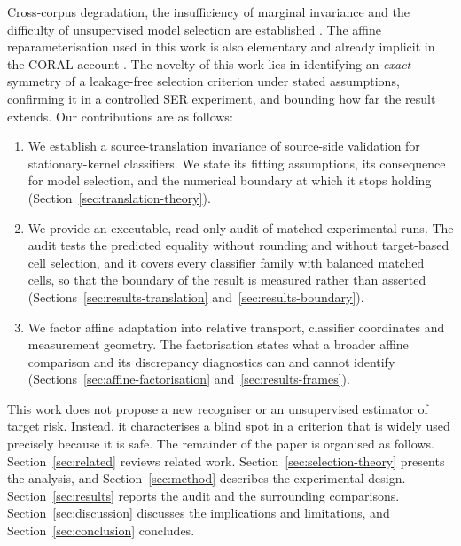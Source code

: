 Cross-corpus degradation, the insufficiency of marginal invariance and the
difficulty of unsupervised model selection are established
\cite{schuller2010cross,zhao2019invariant,you2019selection,ericsson2023practices,hu2024selection}.
The affine reparameterisation used in this work is also elementary and already
implicit in the CORAL account \cite{sun2016coral}. The novelty of this work lies
in identifying an \emph{exact} symmetry of a leakage-free selection criterion
under stated assumptions, confirming it in a controlled SER experiment, and
bounding how far the result extends. Our contributions are as follows:
\begin{enumerate}
 \item We establish a source-translation invariance of source-side validation
   for stationary-kernel classifiers. We state its fitting assumptions, its
   consequence for model selection, and the numerical boundary at which it
   stops holding (Section~\ref{sec:translation-theory}).
 \item We provide an executable, read-only audit of matched experimental runs.
   The audit tests the predicted equality without rounding and without
   target-based cell selection, and it covers every classifier family with
   balanced matched cells, so that the boundary of the result is measured
   rather than asserted
   (Sections~\ref{sec:results-translation} and~\ref{sec:results-boundary}).
 \item We factor affine adaptation into relative transport, classifier
   coordinates and measurement geometry. The factorisation states what a
   broader affine comparison and its discrepancy diagnostics can and cannot
   identify
   (Sections~\ref{sec:affine-factorisation} and~\ref{sec:results-frames}).
\end{enumerate}

This work does not propose a new recogniser or an unsupervised estimator of
target risk. Instead, it characterises a blind spot in a criterion that is
widely used precisely because it is safe. The remainder of the paper is
organised as follows. Section~\ref{sec:related} reviews related work.
Section~\ref{sec:selection-theory} presents the analysis, and
Section~\ref{sec:method} describes the experimental design.
Section~\ref{sec:results} reports the audit and the surrounding comparisons.
Section~\ref{sec:discussion} discusses the implications and limitations, and
Section~\ref{sec:conclusion} concludes.
